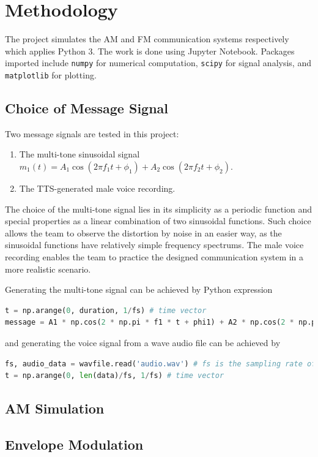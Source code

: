 \documentclass[../ECE459FinalProjectReport.tex]{subfiles}
\begin{document}
\chapter{Methodology}
The project simulates the AM and FM communication systems respectively which applies Python 3. The work is done using Jupyter Notebook. Packages imported include \verb|numpy| for numerical computation, \verb|scipy| for signal analysis, and \verb|matplotlib| for plotting.

\section{Choice of Message Signal}

Two message signals are tested in this project:
\begin{enumerate}
    \item The multi-tone sinusoidal signal $m_1 (t) = A_1\cos(2\pi f_1 t + \phi_1) + A_2 \cos(2\pi f_2 t + \phi_2)$.
    \item The TTS-generated male voice recording.
\end{enumerate}

The choice of the multi-tone signal lies in its simplicity as a periodic function and special properties as a linear combination of two sinusoidal functions. Such choice allows the team to observe the distortion by noise in an easier way, as the sinusoidal functions have relatively simple frequency spectrums. The male voice recording enables the team to practice the designed communication system in a more realistic scenario.

Generating the multi-tone signal can be achieved by Python expression
\begin{lstlisting}[language=python]
t = np.arange(0, duration, 1/fs) # time vector
message = A1 * np.cos(2 * np.pi * f1 * t + phi1) + A2 * np.cos(2 * np.pi * f2 * t + phi2)
\end{lstlisting}
and generating the voice signal from a wave audio file can be achieved by
\begin{lstlisting}[language=python]
fs, audio_data = wavfile.read('audio.wav') # fs is the sampling rate of the audio file
t = np.arange(0, len(data)/fs, 1/fs) # time vector
\end{lstlisting}

\section{AM Simulation}
\section{Envelope Modulation}
\end{document}
